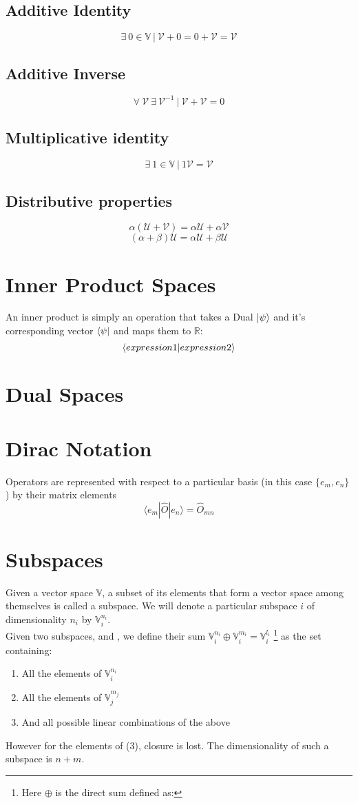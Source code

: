 \subsection{Additive Identity}
$$\exists \  0 \in \mathbb{V} \ | \ \mathcal{V} + 0 = 0 + \mathcal{V} = \mathcal{V}$$
\subsection{Additive Inverse}
$$\forall \ \mathcal{V} \ \exists \ \mathcal{V}^{-1} \ | \ \mathcal{V} + \mathcal{V} = 0$$
\subsection{Multiplicative identity}
$$\exists \ 1 \in \mathbb{V} \ | \ 1 \mathcal{V} = \mathcal{V}$$
\subsection{Distributive properties}
$$\alpha (\mathcal{U} + \mathcal{V}) = \alpha \mathcal{U} + \alpha \mathcal{V}$$
$$(\alpha + \beta) \mathcal{U} = \alpha \mathcal{U} + \beta \mathcal{U}$$
\section{Inner Product Spaces}
An inner product is simply an operation that takes a Dual $\ket{\psi}$ and it's corresponding vector $\bra{\psi}$ and maps them to $\mathbb{R}$:
$$\braket{expression1}{expression2}$$
\section{Dual Spaces}
\section{Dirac Notation}
Operators are represented with respect to a particular basis (in this case $\{e_{m}, e_{n}\}$) by their matrix elements
\begin{equation}
\langle e_{m}| \hat{O} | {e_n} \rangle = \hat{O}_{mn}
\end{equation}
\section{Subspaces}
Given a vector space $\mathbb{V}$, a subset of its elements that form a vector space among themselves is called a subspace. We will denote a particular subspace $i$ of dimensionality $n_{i}$ by $\mathbb{V}^{n_{i}}_{i}$.\\
   Given two subspaces, and , we define their sum $\mathbb{V}^{n_{i}}_{i} \oplus \mathbb{V}^{m_{i}}_{i} = \mathbb{V}^{l_{i}}_{i}$ \footnote{Here $\oplus$ is the direct sum defined as: } as the set containing:
\begin{enumerate}
\item All the elements of $\mathbb{V}^{n_{i}}_{i}$
\item All the elements of $\mathbb{V}^{m_{j}}_{j}$
\item And all possible linear combinations of the above
\end{enumerate} 
However for the elements of (3), closure is lost. The dimensionality of such a subspace is $n + m$.

